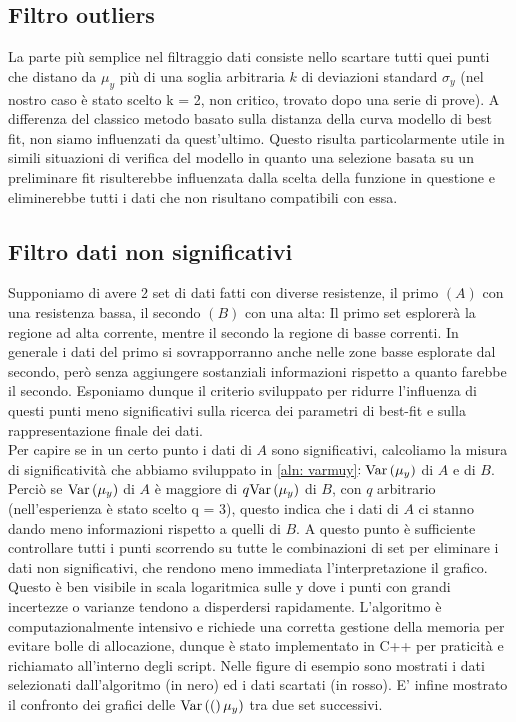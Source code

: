 \documentclass{article}[a4paper, oneside, 11pt]
\begin{document}
\subsection{Filtro outliers}
La parte più semplice nel filtraggio dati consiste nello scartare tutti quei
punti che distano da $\mu_y$ più di una soglia arbitraria $k$ di deviazioni
standard $\sigma_y$ (nel nostro caso è stato scelto k = 2, non critico,
trovato dopo una serie di prove). A differenza del classico metodo basato
sulla distanza della curva modello di best fit, non siamo influenzati da
quest’ultimo. Questo risulta particolarmente utile in simili situazioni di
verifica del modello in quanto una selezione basata su un preliminare fit
risulterebbe influenzata dalla scelta della funzione in questione e
eliminerebbe tutti i dati che non risultano compatibili con essa.
\subsection{Filtro dati non significativi}
Supponiamo di avere 2 set di dati fatti con diverse resistenze, il primo $(A)$
con una resistenza bassa, il secondo $(B)$ con una alta: Il primo set esplorerà
la regione ad alta corrente, mentre il secondo la regione di basse correnti.
In generale i dati del primo si sovrapporranno anche nelle zone basse esplorate
dal secondo, però senza aggiungere sostanziali informazioni rispetto a quanto
farebbe il secondo.
Esponiamo dunque il criterio sviluppato per ridurre l'influenza di questi
punti meno significativi sulla ricerca dei parametri di best-fit e sulla
rappresentazione finale dei dati.\\
Per capire se in un certo punto i dati di $A$ sono significativi, calcoliamo
la misura di significatività che abbiamo sviluppato in \eqref{aln: varmuy}$:
\text{Var}\left(\mu_y\right)$ di $A$ e di $B$. Perciò se $\text{Var}\left(\mu_y\right)$ di $A$ è maggiore di 
$q\text{Var}\left(\mu_y\right)$ di $B$, con $q$ arbitrario (nell’esperienza è stato scelto
q = 3), questo indica che i dati di $A$
ci stanno dando meno informazioni rispetto a quelli di $B$. A questo punto
è sufficiente controllare tutti i punti scorrendo su tutte le combinazioni
di set per eliminare i dati non significativi, che rendono meno
immediata l'interpretazione il grafico. Questo è ben visibile in scala
logaritmica sulle y dove i punti con grandi incertezze o varianze tendono
a disperdersi rapidamente.
L’algoritmo è computazionalmente intensivo e richiede una corretta gestione
della memoria per evitare bolle di allocazione, dunque è stato implementato
in C++ per praticità e richiamato all’interno degli script.
Nelle figure di esempio sono mostrati i dati selezionati dall’algoritmo
(in nero) ed i dati scartati (in rosso). 
E’ infine mostrato il confronto dei grafici delle $\text{Var}\left((\right)\mu_y)$
tra due set successivi.
\end{document}
